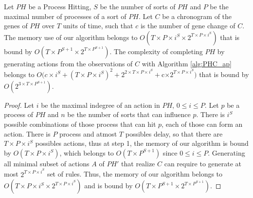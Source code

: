 \begin{theorem}[Complexity]
	\label{th:complexity}
	Let $PH$ be a Process Hitting, $S$ be the number of sorts of $PH$ and $P$ be the maximal number of processes of a sort of $PH$.
	Let $C$ be a chronogram of the genes of $PH$ over $T$ units of time, such that $c$ is the number of gene change of $C$.
	The memory use of our algorithm belongs to $O(T \times  P \times  i^S \times  2^{T\times  P \times  i^S})$ that is bound by $O(T \times  P^{S+1} \times  2^{T\times  P^{S+1}})$.
	The complexity of completing $PH$ by generating actions from the observations of $C$ with Algorithm \ref{alg:PHC_ap} belongs to
	$O(c\times i^S + (T\times P\times i^S)^2 + 2^{2\times T\times  P \times  i^S} + $c$ \times  2^{T\times  P \times  i^S})$ that is bound by $O(2^{3\times T\times P^{S+1}})$.
	\begin{proof}
		Let $i$ be the maximal indegree of an action in $PH$, $0 \leq i \leq P$.
		Let $p$ be a process of $PH$ and $n$ be the number of sorts that can influence $p$.
		There is $i^S$ possible combinations of those process that can hit $p$, each of those can form an action.
		There is $P$ process and atmost $T$ possibles delay, so that there are $T\times  P \times  i^S$ possibles actions,
		thus at step 1, the memory of our algorithm is bound by $O(T \times  P \times  i^S)$,
		which belongs to $O(T\times P^{S+1})$ since $0 \leq i \leq P$.
		Generating all minimal subset of actions $A$ of $PH'$ that realize $C$ can require to generate at most $2^{T\times  P \times  i^S}$ set of rules.
		Thus, the memory of our algorithm belongs to $O(T \times  P \times  i^S \times  2^{T\times  P \times  i^S})$ and is bound by $O(T \times  P^{S+1} \times  2^{T\times  P^{S+1}})$.
		

\end{proof}
\end{theorem}
